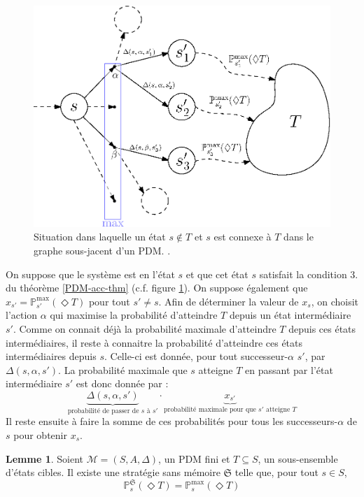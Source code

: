 \documentclass[12pt,a4paper]{report}
\theoremstyle{definition}%
\newtheorem{lemma}{Lemme}[chapter]
\theoremstyle{remark}
\newcommand{\pr}{\mathbb{P}}
\begin{document}
\begin{figure}[H]
	\centering
	\captionsetup{justification=centering}
	\includegraphics[scale=0.75]{figures/accessibilite-PDM-schema}
	\caption{Situation dans laquelle un état $s \not \in T$ et $s$ est connexe à
	$T$ dans le graphe sous-jacent d'un PDM.
	.}
	\label{PDM-acc-figure}
\end{figure}
	On suppose que le système est en l'état $s$ et que cet état $s$ satisfait la
	condition $3.$ du théorème \ref{PDM-acc-thm} (c.f. figure
	\ref{PDM-acc-figure}). On suppose également que $x_{s'} =
	\pr_{s'}^{\max}(\Diamond T)$ pour tout $s' \neq s$. Afin de déterminer
	la valeur de $x_s$, on choisit l'action $\alpha$ qui maximise la probabilité
	d'atteindre $T$ depuis un état intermédiaire $s'$. Comme on connait déjà
	la probabilité maximale d'atteindre $T$ depuis ces états intermédiaires, il reste à
	connaitre la probabilité d'atteindre ces états intermédiaires depuis $s$.
	Celle-ci est donnée, pour tout successeur-$\alpha$ $s'$,
	par $\Delta(s, \alpha, s')$. La probabilité maximale que $s$ atteigne $T$
	en passant par l'état intermédiaire $s'$ est donc donnée par :
	\[\underbrace{\Delta(s, \alpha, s')}_{\text{probabilité de passer de $s$ à $s'$}} \cdot \underbrace{x_{s'}}_{\text{probabilité maximale pour que $s'$ atteigne $T$}}\]
	Il reste ensuite à faire la somme
	de ces probabilités pour tous les successeurs-$\alpha$ de $s$ pour obtenir
	$x_s$.

\begin{lemma}\label{strat-proof}
		Soient $\mathcal{M} = (S, A, \Delta)$, un PDM fini et $T \subseteq S$, un
		sous-ensemble d'états cibles. Il existe une stratégie sans mémoire
		$\mathfrak{S}$ telle que, pour tout $s \in S$,
		\[
			\pr^\mathfrak{S}_s(\Diamond T) = \pr^{\max}_s(\Diamond T)
		\]
\end{lemma}
\end{document}
